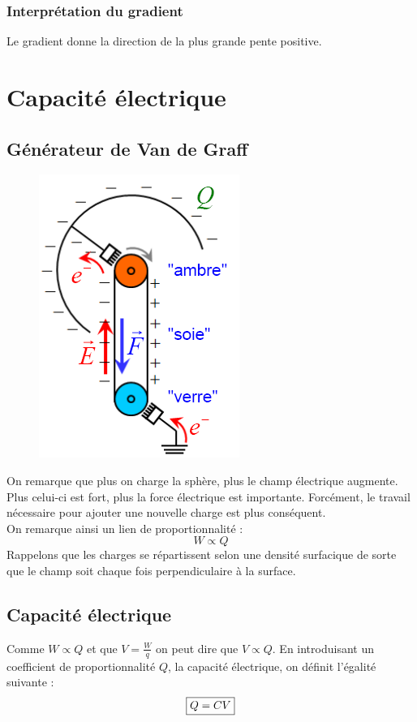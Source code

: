 \documentclass	[11pt, a4paper, openany]{book}
\begin{document}
\subsubsection{Interprétation du gradient}
Le gradient donne la direction de la plus grande pente positive.

\section{Capacité électrique}
\subsection{Générateur de Van de Graff}
\begin{figure}
	\includegraphics[scale=0.34]{es/image12.png}
\end{figure}
On remarque que plus on charge la sphère, plus le champ électrique augmente. Plus celui-ci est fort, plus la force électrique est importante. Forcément, le travail nécessaire pour ajouter une nouvelle charge est plus conséquent.\\
On remarque ainsi un lien de proportionnalité :
\begin{equation}
	W \propto Q
\end{equation}
Rappelons que les charges se répartissent selon une densité surfacique de sorte que le champ soit chaque fois perpendiculaire à la surface.

\subsection{Capacité électrique}
Comme $W \propto Q$ et que $V = \frac{W}{q}$ on peut dire que $V \propto Q$. En introduisant un coefficient de proportionnalité $Q$, la capacité électrique, on définit l'égalité suivante :
\begin{equation}
	\fbox{$Q = CV$}
\end{equation}
\end{document}
